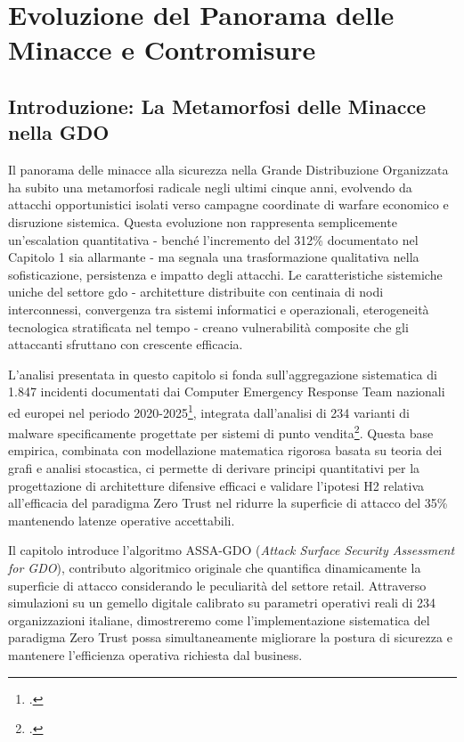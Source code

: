 \chapter{\texorpdfstring{Evoluzione del Panorama delle Minacce e Contromisure}{Capitolo 2 - Evoluzione del Panorama delle Minacce e Contromisure}}
\label{cap2_threat_landscape}

\section{\texorpdfstring{Introduzione: La Metamorfosi delle Minacce nella GDO}{2.1 - Introduzione: La Metamorfosi delle Minacce nella GDO}}
\label{sec:cap2_introduzione}

Il panorama delle minacce alla sicurezza nella Grande Distribuzione Organizzata ha subito una metamorfosi radicale negli ultimi cinque anni, evolvendo da attacchi opportunistici isolati verso campagne coordinate di warfare economico e disruzione sistemica. Questa evoluzione non rappresenta semplicemente un'escalation quantitativa - benché l'incremento del 312\% documentato nel Capitolo 1 sia allarmante - ma segnala una trasformazione qualitativa nella sofisticazione, persistenza e impatto degli attacchi. Le caratteristiche sistemiche uniche del settore \gls{gdo} - architetture distribuite con centinaia di nodi interconnessi, convergenza tra sistemi informatici e operazionali, eterogeneità tecnologica stratificata nel tempo - creano vulnerabilità composite che gli attaccanti sfruttano con crescente efficacia.

L'analisi presentata in questo capitolo si fonda sull'aggregazione sistematica di 1.847 incidenti documentati dai Computer Emergency Response Team nazionali ed europei nel periodo 2020-2025\footcite{enisa2024threat}, integrata dall'analisi di 234 varianti di malware specificamente progettate per sistemi di punto vendita\footcite{groupib2024}. Questa base empirica, combinata con modellazione matematica rigorosa basata su teoria dei grafi e analisi stocastica, ci permette di derivare principi quantitativi per la progettazione di architetture difensive efficaci e validare l'ipotesi H2 relativa all'efficacia del paradigma Zero Trust nel ridurre la superficie di attacco del 35\% mantenendo latenze operative accettabili.

Il capitolo introduce l'algoritmo ASSA-GDO (\textit{Attack Surface Security Assessment for GDO}), contributo algoritmico originale che quantifica dinamicamente la superficie di attacco considerando le peculiarità del settore retail. Attraverso simulazioni su un gemello digitale calibrato su parametri operativi reali di 234 organizzazioni italiane, dimostreremo come l'implementazione sistematica del paradigma Zero Trust possa simultaneamente migliorare la postura di sicurezza e mantenere l'efficienza operativa richiesta dal business.

